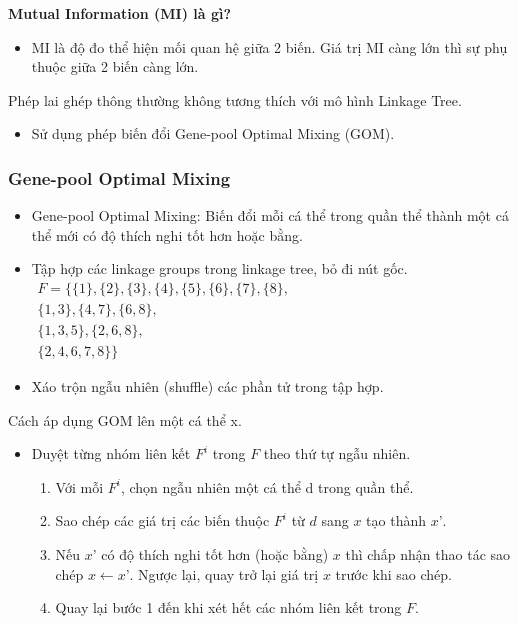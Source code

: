 \documentclass{book}
\begin{document}
            \textbf{Mutual Information (MI) là gì?}
            \begin{itemize}
                \item MI là độ đo thể hiện mối quan hệ giữa 2 biến. Giá trị MI càng lớn thì sự phụ thuộc giữa 2 biến càng lớn.
            \end{itemize}
            Phép lai ghép thông thường không tương thích với mô hình Linkage Tree.
            \begin{itemize}
                \item Sử dụng phép biến đổi Gene-pool Optimal Mixing (GOM).
            \end{itemize}
            \subsubsection{Gene-pool Optimal Mixing}
            \begin{itemize}
                \item Gene-pool Optimal Mixing: Biến đổi mỗi cá thể trong quần thể thành một cá thể mới có độ thích nghi tốt hơn hoặc bằng.
                \item Tập hợp các linkage groups trong linkage tree, bỏ đi nút gốc.
                $
                \begin{aligned}
                F=\{\{1\},\{2\},\{3\},\{4\},\{5\},\{6\},\{7\},\{8\},\\
                \{1,3\},\{4,7\},\{6,8\},\\
                \{1,3,5\},\{2,6,8\},\\
                \{2,4,6,7,8\}\}
                \end{aligned}
                $
                \item Xáo trộn ngẫu nhiên (shuffle) các phần tử trong tập hợp.
        
            \end{itemize}
            Cách áp dụng GOM lên một cá thể x.
            \begin{itemize}
                \item Duyệt từng nhóm liên kết $F^i$ trong $F$ theo thứ tự ngẫu nhiên.
                \begin{enumerate}
                    \item Với mỗi $F^i$, chọn ngẫu nhiên một cá thể d trong quần thể.
                    \item Sao chép các giá trị các biến thuộc $F^i$ từ $d$ sang $x$ tạo thành $x’$.
                    \item Nếu $x’$ có độ thích nghi tốt hơn (hoặc bằng) $x$ thì chấp nhận thao tác sao chép $x \leftarrow x’$. Ngược lại, quay trở lại giá trị $x$ trước khi sao chép.
                    \item Quay lại bước 1 đến khi xét hết các nhóm liên kết trong $F$.
                \end{enumerate}
            \end{itemize}
\end{document}
